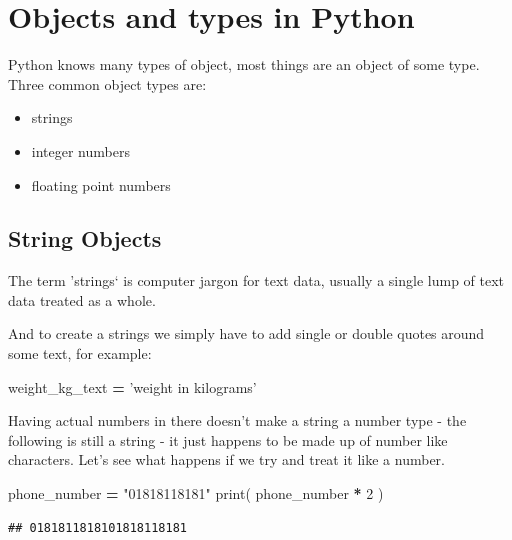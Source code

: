 \documentclass[]{book}
\newenvironment{Shaded}{\begin{snugshade}}{\end{snugshade}}
\newcommand{\BuiltInTok}[1]{#1}
\newcommand{\DecValTok}[1]{\textcolor[rgb]{0.00,0.00,0.81}{#1}}
\newcommand{\NormalTok}[1]{#1}
\newcommand{\OperatorTok}[1]{\textcolor[rgb]{0.81,0.36,0.00}{\textbf{#1}}}
\newcommand{\StringTok}[1]{\textcolor[rgb]{0.31,0.60,0.02}{#1}}
\providecommand{\tightlist}{%
  \setlength{\itemsep}{0pt}\setlength{\parskip}{0pt}}
\theoremstyle{definition}
\theoremstyle{definition}
\theoremstyle{definition}
\theoremstyle{remark}
\begin{document}
\hypertarget{objects-and-types-in-python}{%
\section{Objects and types in
Python}\label{objects-and-types-in-python}}

Python knows many types of object, most things are an object of some
type. Three common object types are:

\begin{itemize}
\tightlist
\item
  strings
\item
  integer numbers
\item
  floating point numbers
\end{itemize}

\hypertarget{string-objects}{%
\subsection{String Objects}\label{string-objects}}

The term 'strings` is computer jargon for text data, usually a single
lump of text data treated as a whole.

And to create a strings we simply have to add single or double quotes
around some text, for example:

\begin{Shaded}
\begin{Highlighting}[]
\NormalTok{weight_kg_text }\OperatorTok{=} \StringTok{'weight in kilograms'}
\end{Highlighting}
\end{Shaded}

Having actual numbers in there doesn't make a string a number type - the
following is still a string - it just happens to be made up of number
like characters. Let's see what happens if we try and treat it like a
number.

\begin{Shaded}
\begin{Highlighting}[]
\NormalTok{phone_number }\OperatorTok{=} \StringTok{"01818118181"}
\BuiltInTok{print}\NormalTok{( phone_number }\OperatorTok{*} \DecValTok{2}\NormalTok{ )}
\end{Highlighting}
\end{Shaded}

\begin{verbatim}
## 0181811818101818118181
\end{verbatim}
\end{document}
